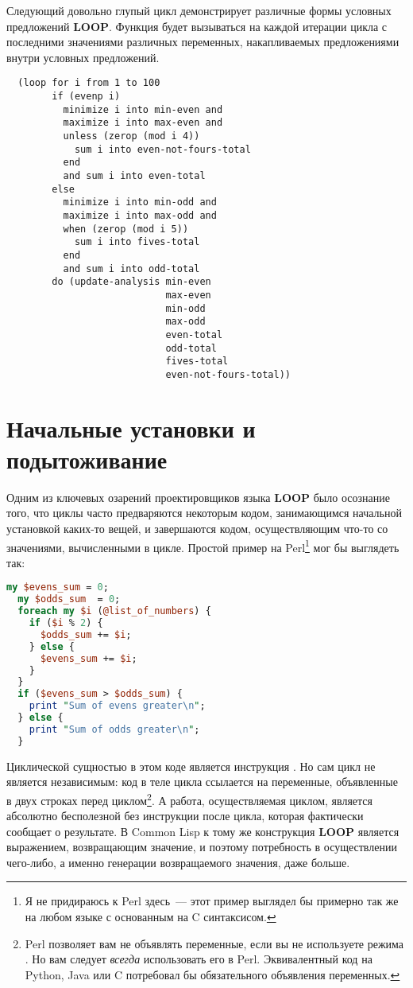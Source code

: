Следующий довольно глупый цикл демонстрирует различные формы условных предложений
\textbf{LOOP}. Функция  будет вызываться на каждой итерации цикла с
последними значениями различных переменных, накапливаемых пред\-ло\-же\-ния\-ми внутри условных
предложений.

\begin{lstlisting}
  (loop for i from 1 to 100
        if (evenp i)
          minimize i into min-even and 
          maximize i into max-even and
          unless (zerop (mod i 4))
            sum i into even-not-fours-total
          end
          and sum i into even-total
        else
          minimize i into min-odd and
          maximize i into max-odd and
          when (zerop (mod i 5)) 
            sum i into fives-total
          end
          and sum i into odd-total
        do (update-analysis min-even
                            max-even
                            min-odd
                            max-odd
                            even-total
                            odd-total
                            fives-total
                            even-not-fours-total))
\end{lstlisting}

\section{Начальные установки и подытоживание}

Одним из ключевых озарений проектировщиков языка \textbf{LOOP} было осознание того, что
циклы часто предваряются некоторым кодом, занимающимся начальной установкой каких-то
вещей, и завершаются кодом, осуществляющим что-то со значениями, вычисленными в
цикле. Простой пример на Perl\footnote{Я не придираюсь к Perl здесь~--- этот пример
  выглядел бы примерно так же на любом языке с основанным на C синтаксисом.} мог бы
выглядеть так:

\begin{lstlisting}[language=Perl]
my $evens_sum = 0;
  my $odds_sum  = 0;
  foreach my $i (@list_of_numbers) {
    if ($i % 2) {
      $odds_sum += $i;
    } else {
      $evens_sum += $i;
    }
  }
  if ($evens_sum > $odds_sum) {
    print "Sum of evens greater\n";
  } else {
    print "Sum of odds greater\n";
  }
\end{lstlisting}

Циклической сущностью в этом коде является инструкция . Но сам цикл
 не является независимым: код в теле цикла ссылается на переменные,
объявленные в двух строках перед циклом\footnote{Perl позволяет вам не объявлять
  переменные, если вы не используете режима . Но вам следует \textit{всегда}
  использовать его в Perl. Эквивалентный код на Python, Java или C потребовал бы
  обязательного объявления переменных.}. А работа, осуществляемая циклом, является
абсолютно бесполезной без инструкции  после цикла, которая фактически сообщает о
результате. В Common Lisp к тому же конструкция \textbf{LOOP} является выражением,
возвращающим значение, и поэтому потребность в осуществлении чего-либо, а именно генерации
возвращаемого значения, даже больше.

